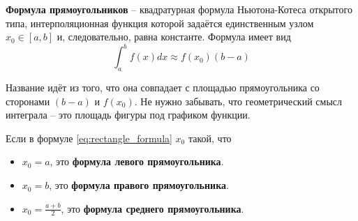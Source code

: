 \documentclass[../main.tex]{subfile}
\begin{document}
\begin{define}\label{eq:rectangle_formula}
	\textbf{Формула прямоугольников} -- квадратурная формула Ньютона-Котеса
	открытого типа, интерполяционная функция которой задаётся единственным
	узлом $x_0\in[a,b]$ и, следовательно, равна константе. Формула имеет вид
	\[\boxed{\int_{a}^{b}f(x)dx\approx f(x_0)(b-a)}\]
\end{define}

Название идёт из того, что она совпадает с площадью прямоугольника со сторонами
$(b-a)$ и $f(x_0)$. Не нужно забывать, что геометрический смысл интеграла -- это
площадь фигуры под графиком функции.

\begin{define}
	Если в формуле \eqref{eq:rectangle_formula} $x_0$ такой, что
	\begin{itemize}[noitemsep, nolistsep]
		\item $x_0=a$, это \textbf{формула левого прямоугольника}.
		\item $x_0=b$, это \textbf{формула правого прямоугольника}.
		\item $x_0=\frac{a+b}{2}$, это \textbf{формула среднего
			прямоугольника}.
	\end{itemize}

	\begin{figure}[ht]
	\centering
	\newcommand*{\varA}{0.8}
	\newcommand*{\varB}{3}
	\newcommand*{\Height}{6cm}
	\newcommand*{\Width}{6cm}
	\pgfmathsetmacro{\fa}{f(\varA)}
	\pgfmathsetmacro{\fb}{f(\varB)}
	\pgfmathsetmacro{\leftDomain}{\varA-0.5}
	\pgfmathsetmacro{\rightDomain}{\varB+0.5}

\end{figure}
\end{define}
\end{document}

